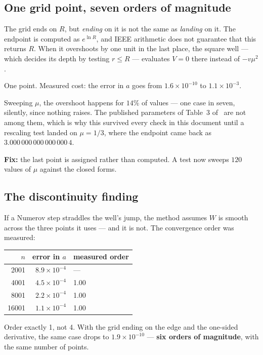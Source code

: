 \documentclass[11pt,a4paper]{article}
\begin{document}
\subsection*{One grid point, seven orders of magnitude}

The grid ends on $R$, but \emph{ending} on it is not the same as \emph{landing}
on it. The endpoint is computed as $e^{\ln R}$, and IEEE arithmetic does not
guarantee that this returns $R$. When it overshoots by one unit in the last
place, the square well --- which decides its depth by testing $r \le R$ ---
evaluates $V = 0$ there instead of $-v\mu^2$.

One point. Measured cost: the error in $a$ goes from $1.6\times10^{-10}$ to
$1.1\times10^{-3}$.

Sweeping $\mu$, the overshoot happens for $14\%$ of values --- one case in
seven, silently, since nothing raises. The published parameters of Table~3
of~\cite{rbef} are not among them, which is why this survived every check in
this document until a rescaling test landed on $\mu = 1/3$, where the endpoint
came back as $3.000\,000\,000\,000\,000\,4$.

\textbf{Fix:} the last point is assigned rather than computed. A test now
sweeps $120$ values of $\mu$ against the closed forms.

\subsection*{The discontinuity finding}

If a Numerov step straddles the well's jump, the method assumes $W$ is smooth
across the three points it uses --- and it is not. The convergence order was
measured:

\begin{center}
\begin{tabular}{rrl}
\toprule
$n$ & error in $a$ & measured order \\
\midrule
2001  & $8.9\times10^{-4}$ & --- \\
4001  & $4.5\times10^{-4}$ & 1.00 \\
8001  & $2.2\times10^{-4}$ & 1.00 \\
16001 & $1.1\times10^{-4}$ & 1.00 \\
\bottomrule
\end{tabular}
\end{center}

Order exactly 1, not 4. With the grid ending on the edge and the one-sided
derivative, the same case drops to $1.9\times10^{-10}$ --- \textbf{six orders of
magnitude}, with the same number of points.
\end{document}
